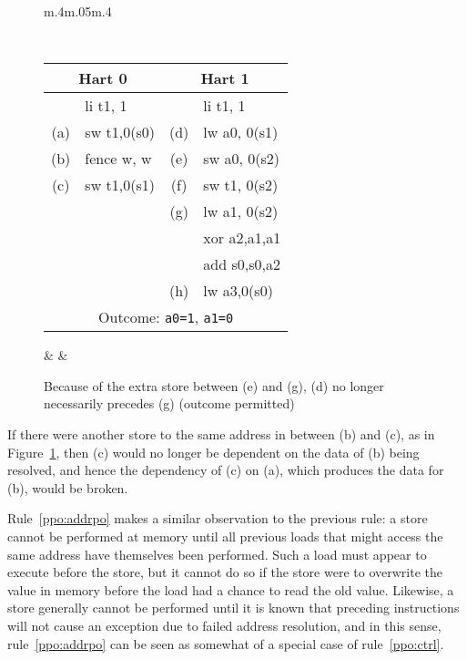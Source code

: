 \begin{figure}[h!]
  \centering
  \begin{tabular}{m{.4\linewidth}m{.05\linewidth}m{.4\linewidth}}
  {
    \tt\small
    \begin{tabular}{cl||cl}
    \multicolumn{2}{c}{Hart 0} & \multicolumn{2}{c}{Hart 1} \\
    \hline
          & li t1, 1    &     & li t1, 1       \\
      (a) & sw t1,0(s0) & (d) & lw a0, 0(s1)   \\
      (b) & fence w, w  & (e) & sw a0, 0(s2)   \\
      (c) & sw t1,0(s1) & (f) & sw t1, 0(s2)   \\
          &             & (g) & lw a1, 0(s2)   \\
          &             &     & xor a2,a1,a1   \\
          &             &     & add s0,s0,a2   \\
          &             & (h) & lw a3,0(s0)    \\   

      \hline
      \multicolumn{4}{c}{Outcome: {\tt a0=1}, {\tt a1=0}}
    \end{tabular}
  } & &
  
  \end{tabular}

  \caption{Because of the extra store between (e) and (g), (d) no longer necessarily precedes (g) (outcome permitted)}
  \label{fig:litmus:addrdatarfi_no}
\end{figure}

If there were another store to the same address in between (b) and (c), as in Figure~\ref{fig:litmus:addrdatarfi_no}, then (c) would no longer be dependent on the data of (b) being resolved, and hence the dependency of (c) on (a), which produces the data for (b), would be broken.

Rule~\ref{ppo:addrpo} makes a similar observation to the previous rule: a store cannot be performed at memory until all previous loads that might access the same address have themselves been performed.
Such a load must appear to execute before the store, but it cannot do so if the store were to overwrite the value in memory before the load had a chance to read the old value.
Likewise, a store generally cannot be performed until it is known that preceding instructions will not cause an exception due to failed address resolution, and in this sense, rule~\ref{ppo:addrpo} can be seen as somewhat of a special case of rule~\ref{ppo:ctrl}.

